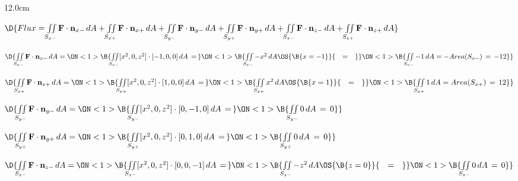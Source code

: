 \begin{frame}
\begin{columns}\begin{column}{12.0cm}
\scriptsize

$\D{Flux = \iint \limits_{S_{x-}} {\bf F} \cdot {\bf n}_{x-}\, dA + \iint \limits_{S_{x+}} {\bf F} \cdot {\bf n}_{x+}\, dA + \iint \limits_{S_{y-}} {\bf F} \cdot {\bf n}_{y-}\, dA + \iint \limits_{S_{y+}} {\bf F} \cdot {\bf n}_{y+}\, dA + \iint \limits_{S_{z-}} {\bf F} \cdot {\bf n}_{z-}\, dA + \iint \limits_{S_{z+}} {\bf F} \cdot {\bf n}_{z+}\, dA}$

\vspace{0.4cm}

$\D{\iint \limits_{S_{x-}} {\bf F} \cdot {\bf n}_{x-}\, dA = 
\ON<1>{\B{\iint \limits_{S_{x-}} [x^2,0,z^2] \cdot [-1,0,0]\, dA \,=\, }}
\ON<1>{\B{\iint \limits_{S_{x-}} -x^2 \, dA \OS{\B{x=-1}}{\quad=\quad} }}
\ON<1>{\B{\iint \limits_{S_{x-}} -1 \, dA = -Area(S_{x-}) \,=\, -12}}}$

\vspace{0.2cm}

$\D{\iint \limits_{S_{x+}} {\bf F} \cdot {\bf n}_{x+}\, dA = 
\ON<1>{\B{\iint \limits_{S_{x+}} [x^2,0,z^2] \cdot [1,0,0]\, dA \,=\, }}
\ON<1>{\B{\iint \limits_{S_{x+}} x^2 \, dA \OS{\B{x=1}}{\quad=\quad} }}
\ON<1>{\B{\iint \limits_{S_{x+}} 1 \, dA = Area(S_{x+}) \,=\, 12}}}$

\vspace{0.2cm}

$\D{\iint \limits_{S_{y-}} {\bf F} \cdot {\bf n}_{y-}\, dA = 
\ON<1>{\B{\iint \limits_{S_{y-}} [x^2,0,z^2] \cdot [0,-1,0]\, dA \,=\,}}
\ON<1>{\B{\iint \limits_{S_{y-}} 0 \, dA \, = \, 0 }}}$

\vspace{0.2cm}

$\D{\iint \limits_{S_{y+}} {\bf F} \cdot {\bf n}_{y+}\, dA = 
\ON<1>{\B{\iint \limits_{S_{y+}} [x^2,0,z^2] \cdot [0,1,0]\, dA \,=\,}}
\ON<1>{\B{\iint \limits_{S_{y+}} 0 \, dA \, = \, 0 }}}$

\vspace{0.2cm}

$\D{\iint \limits_{S_{z-}} {\bf F} \cdot {\bf n}_{z-}\, dA = 
\ON<1>{\B{\iint \limits_{S_{z-}} [x^2,0,z^2] \cdot [0,0,-1]\, dA \,=\, }}
\ON<1>{\B{\iint \limits_{S_{z-}} -z^2 \, dA \OS{\B{z=0}}{\quad=\quad} }}
\ON<1>{\B{\iint \limits_{S_{z-}} 0 \, dA \,=\, 0}}}$

\vspace{0.2cm}


\end{column}
\end{columns}
\end{frame}
